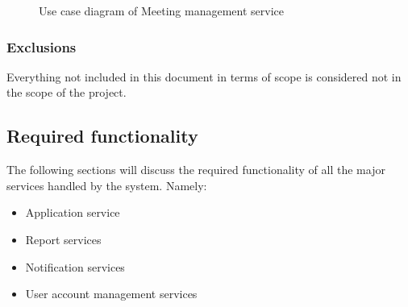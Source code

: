 \documentclass[12pt]{article}
\begin{document}
\begin{figure}[H]
\centering	
{}
\caption{Use case diagram of Meeting management service}
\end{figure}

\vspace{0.2in}
\subsubsection{Exclusions}
\vspace{0.2in}
Everything not included in this document in terms of scope is considered not in the scope of the project.
\vspace{0.2in}

\subsection{Required functionality} %
\vspace{0.2in}
The following sections will discuss the required functionality of all the major services handled by the system. Namely:
\begin{itemize}
\item Application service
\item Report services
\item Notification services
\item User account management services
\end{itemize}
\end{document}
